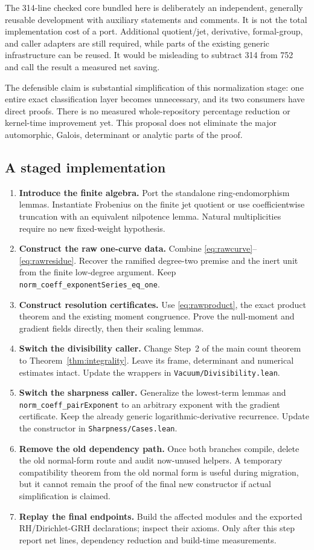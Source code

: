 \documentclass[11pt,letterpaper]{article}
\theoremstyle{remark}
\newcommand{\code}[1]{{\small\nolinkurl{#1}}}
\begin{document}
The 314-line checked core bundled here is deliberately an independent,
generally reusable development with auxiliary statements and comments. It is
not the total implementation cost of a port. Additional quotient/jet, derivative,
formal-group, and caller adapters are still required, while parts of the existing
generic infrastructure can be reused. It would be misleading to subtract 314
from 752 and call the result a measured net saving.

The defensible claim is substantial simplification of this normalization stage:
one entire exact classification layer becomes unnecessary, and its two consumers
have direct proofs. There is no measured whole-repository percentage reduction
or kernel-time improvement yet. This proposal does not eliminate the major
automorphic, Galois, determinant or analytic parts of the proof.

\subsection{A staged implementation}

\begin{enumerate}
\item \textbf{Introduce the finite algebra.} Port the standalone ring-endomorphism
lemmas. Instantiate Frobenius on the finite jet quotient or use coefficientwise
truncation with an equivalent nilpotence lemma. Natural multiplicities require no
new fixed-weight hypothesis.
\item \textbf{Construct the raw one-curve data.} Combine
\eqref{eq:rawcurve}--\eqref{eq:rawresidue}. Recover the ramified degree-two
premise and the inert unit from the finite low-degree argument. Keep
\code{norm_coeff_exponentSeries_eq_one}.
\item \textbf{Construct resolution certificates.} Use
\eqref{eq:rawproduct}, the exact product theorem and the existing moment congruence.
Prove the null-moment and gradient fields directly, then their scaling lemmas.
\item \textbf{Switch the divisibility caller.} Change Step~2 of the main count
theorem to Theorem~\ref{thm:integrality}. Leave its frame, determinant and numerical
estimates intact. Update the wrappers in \code{Vacuum/Divisibility.lean}.
\item \textbf{Switch the sharpness caller.} Generalize the lowest-term lemmas and
\code{norm_coeff_pairExponent} to an arbitrary exponent with the gradient
certificate. Keep the already generic logarithmic-derivative recurrence. Update
the constructor in \code{Sharpness/Cases.lean}.
\item \textbf{Remove the old dependency path.} Once both branches compile,
delete the old normal-form route and audit now-unused helpers. A temporary
compatibility theorem from the old normal form is useful during migration, but
it cannot remain the proof of the final new constructor if actual simplification
is claimed.
\item \textbf{Replay the final endpoints.} Build the affected modules and the
exported RH/Dirichlet-GRH declarations; inspect their axioms. Only after this
step report net lines, dependency reduction and build-time measurements.
\end{enumerate}
\end{document}
